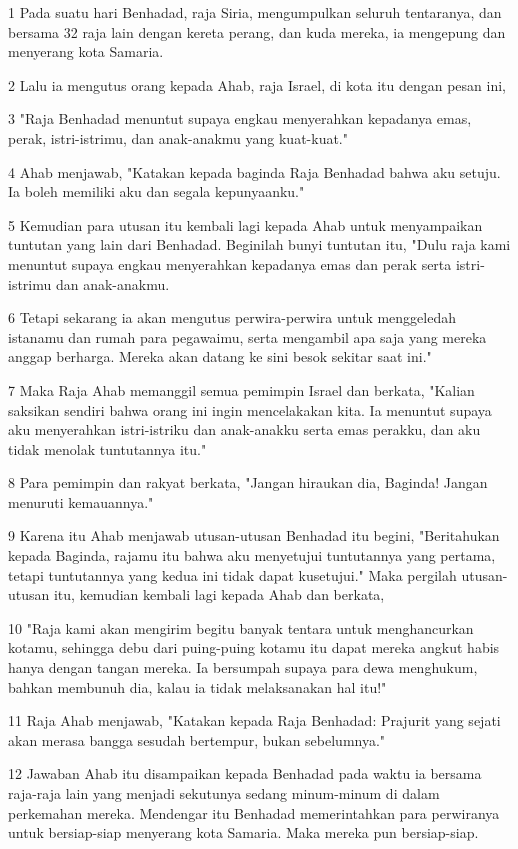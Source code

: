 \par 1 Pada suatu hari Benhadad, raja Siria, mengumpulkan seluruh tentaranya, dan bersama 32 raja lain dengan kereta perang, dan kuda mereka, ia mengepung dan menyerang kota Samaria.
\par 2 Lalu ia mengutus orang kepada Ahab, raja Israel, di kota itu dengan pesan ini,
\par 3 "Raja Benhadad menuntut supaya engkau menyerahkan kepadanya emas, perak, istri-istrimu, dan anak-anakmu yang kuat-kuat."
\par 4 Ahab menjawab, "Katakan kepada baginda Raja Benhadad bahwa aku setuju. Ia boleh memiliki aku dan segala kepunyaanku."
\par 5 Kemudian para utusan itu kembali lagi kepada Ahab untuk menyampaikan tuntutan yang lain dari Benhadad. Beginilah bunyi tuntutan itu, "Dulu raja kami menuntut supaya engkau menyerahkan kepadanya emas dan perak serta istri-istrimu dan anak-anakmu.
\par 6 Tetapi sekarang ia akan mengutus perwira-perwira untuk menggeledah istanamu dan rumah para pegawaimu, serta mengambil apa saja yang mereka anggap berharga. Mereka akan datang ke sini besok sekitar saat ini."
\par 7 Maka Raja Ahab memanggil semua pemimpin Israel dan berkata, "Kalian saksikan sendiri bahwa orang ini ingin mencelakakan kita. Ia menuntut supaya aku menyerahkan istri-istriku dan anak-anakku serta emas perakku, dan aku tidak menolak tuntutannya itu."
\par 8 Para pemimpin dan rakyat berkata, "Jangan hiraukan dia, Baginda! Jangan menuruti kemauannya."
\par 9 Karena itu Ahab menjawab utusan-utusan Benhadad itu begini, "Beritahukan kepada Baginda, rajamu itu bahwa aku menyetujui tuntutannya yang pertama, tetapi tuntutannya yang kedua ini tidak dapat kusetujui." Maka pergilah utusan-utusan itu, kemudian kembali lagi kepada Ahab dan berkata,
\par 10 "Raja kami akan mengirim begitu banyak tentara untuk menghancurkan kotamu, sehingga debu dari puing-puing kotamu itu dapat mereka angkut habis hanya dengan tangan mereka. Ia bersumpah supaya para dewa menghukum, bahkan membunuh dia, kalau ia tidak melaksanakan hal itu!"
\par 11 Raja Ahab menjawab, "Katakan kepada Raja Benhadad: Prajurit yang sejati akan merasa bangga sesudah bertempur, bukan sebelumnya."
\par 12 Jawaban Ahab itu disampaikan kepada Benhadad pada waktu ia bersama raja-raja lain yang menjadi sekutunya sedang minum-minum di dalam perkemahan mereka. Mendengar itu Benhadad memerintahkan para perwiranya untuk bersiap-siap menyerang kota Samaria. Maka mereka pun bersiap-siap.
